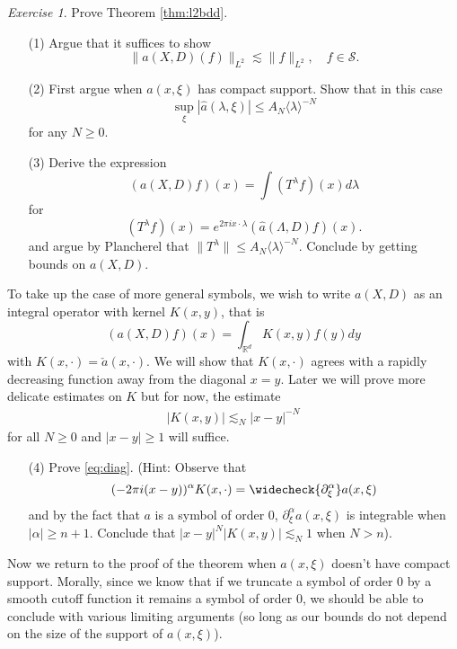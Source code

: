 \documentclass[11pt]{article}
\theoremstyle{remark}
\newtheorem{exr}{Exercise}
\newcommand{\calS}{\mathcal{S}}
\newcommand{\1}{\textbf{1}}
\newcommand{\lle}{\lesssim}
\def\norm#1{\| #1  \|}
\def\brac#1{\langle #1  \rangle}
\newcommand{\bbR}{\mathbb{R}}
\begin{document}
\begin{exr}
Prove Theorem \ref{thm:l2bdd}.
\begin{enumerate}
\item[(1)] Argue that it suffices to show
\[
\norm{a(X,D)(f)}_{L^2} \lle \norm{f}_{L^2} ,\quad f\in \calS.
\]
\item[(2)]  First argue when $a(x, \xi)$ has compact support. Show that in this case
\[
\sup_\xi |\hat{a}(\lambda, \xi)| \leq A_N\brac{\lambda}^{-N}
\]
for any $N \geq 0$.
\item[(3)] Derive the expression
\[
(a(X,D) f)(x) = \int (T^\lambda f)(x) d\lambda
\]
for
\[
(T^\lambda f)(x) = e^{2 \pi i x \cdot \lambda} (\hat{a}(\Lambda,D) f)(x).
\]
and argue by Plancherel that $\|T^\lambda\| \leq A_N \brac{\lambda}^{-N}$. Conclude by getting bounds on $a(X,D)$.
\end{enumerate}

To take up the case of more general symbols, we wish to write $a(X,D)$ as an integral operator with kernel $K(x,y)$, that is
\[
(a(X,D) f)(x) = \int_{\bbR^d} K(x,y) f(y)dy
\]
with $K(x, \cdot) = \check{a}(x, \cdot)$. We will show that $K(x, \cdot)$ agrees with a rapidly decreasing function away from the diagonal $x = y$. Later we will prove more delicate estimates on $K$ but for now, the estimate
\begin{align}
|K(x,y)| \lle_N |x-y|^{-N}
\label{eq:diag}
\end{align}
for all $N \geq 0$ and $|x-y| \geq 1$ will suffice.
\begin{enumerate}
\item[(4)] Prove \eqref{eq:diag}. (Hint: Observe that 
\[
(-2 \pi i (x-y))^\alpha K(x, \cdot) = \widecheck{\partial_\xi^\alpha} a(x,\xi)
\]
and by the fact that $a$ is a symbol of order $0$, $\partial_\xi^\alpha a(x,\xi)$ is integrable when $ |\alpha| \geq n +1$. Conclude that $|x-y|^N|K(x,y)| \lle_N 1$ when $N > n$).
\end{enumerate}
Now we return to the proof of the theorem when $a(x,\xi)$ doesn't have compact support. Morally, since we know that if we truncate a symbol of order $0$ by a smooth cutoff function it remains a symbol of order $0$, we should be able to conclude with various limiting arguments (so long as our bounds do not depend on the size of the support of $a(x, \xi)$). 


\end{exr}
\end{document}
